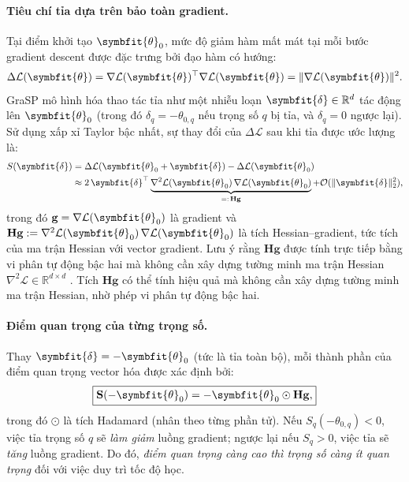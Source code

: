 \paragraph{\textbf{Tiêu chí tỉa dựa trên bảo toàn gradient.}}
Tại điểm khởi tạo $\symbfit{\theta}_0$, mức độ giảm hàm mất mát tại mỗi bước
gradient descent được đặc trưng bởi đạo hàm có hướng:
\begin{equation}
    \Delta\mathcal{L}(\symbfit{\theta})
    = \nabla\mathcal{L}(\symbfit{\theta})^\top \nabla\mathcal{L}(\symbfit{\theta})
    = \|\nabla\mathcal{L}(\symbfit{\theta})\|^2.
    \label{eq:gradient_flow}
\end{equation}
GraSP mô hình hóa thao tác tỉa như một nhiễu loạn
$\symbfit{\delta} \in \mathbb{R}^d$ tác động lên $\symbfit{\theta}_0$
(trong đó $\delta_q = -\theta_{0,q}$ nếu trọng số $q$ bị tỉa, và
$\delta_q = 0$ ngược lại).
Sử dụng xấp xỉ Taylor bậc nhất, sự thay đổi của $\Delta\mathcal{L}$
sau khi tỉa được ước lượng là:
\begin{align}
    S(\symbfit{\delta})
     & = \Delta\mathcal{L}(\symbfit{\theta}_0 + \symbfit{\delta})
    - \Delta\mathcal{L}(\symbfit{\theta}_0) \notag                \\
     & \approx 2\,\symbfit{\delta}^\top
    \underbrace{\nabla^2\mathcal{L}(\symbfit{\theta}_0)
        \,\nabla\mathcal{L}(\symbfit{\theta}_0)}_{=:\,\mathbf{Hg}}
    + \mathcal{O}(\|\symbfit{\delta}\|_2^2),
    \label{eq:taylor_approx}
\end{align}
trong đó $\mathbf{g} = \nabla \mathcal{L}(\symbfit{\theta}_0)$ là gradient và
$\mathbf{H}\mathbf{g} := \nabla^2 \mathcal{L}(\symbfit{\theta}_0)\,\nabla \mathcal{L}(\symbfit{\theta}_0)$
là tích Hessian--gradient, tức tích của ma trận Hessian với vector gradient.
Lưu ý rằng $\mathbf{Hg}$ được tính trực tiếp bằng vi phân tự động bậc hai
mà không cần xây dựng tường minh ma trận Hessian $\nabla^2\mathcal{L} \in \mathbb{R}^{d\times d}$
.
Tích $\mathbf{Hg}$ có thể tính hiệu quả mà không cần xây dựng tường minh
ma trận Hessian, nhờ phép vi phân tự động bậc hai.

\paragraph{\textbf{Điểm quan trọng của từng trọng số.}}
Thay $\symbfit{\delta} = -\symbfit{\theta}_0$ (tức là tỉa toàn bộ), mỗi thành phần
của điểm quan trọng vector hóa được xác định bởi:
\begin{equation}
    \boxed{
        \mathbf{S}(-\symbfit{\theta}_0)
        = -\symbfit{\theta}_0 \odot \mathbf{Hg},
    }
    \label{eq:grasp_score}
\end{equation}
trong đó $\odot$ là tích Hadamard (nhân theo từng phần tử).
Nếu $S_q(-\theta_{0,q}) < 0$, việc tỉa trọng số $q$ sẽ \emph{làm giảm}
luồng gradient; ngược lại nếu $S_q > 0$, việc tỉa sẽ \emph{tăng}
luồng gradient.
Do đó, \emph{điểm quan trọng càng cao thì trọng số càng ít quan trọng}
đối với việc duy trì tốc độ học.

